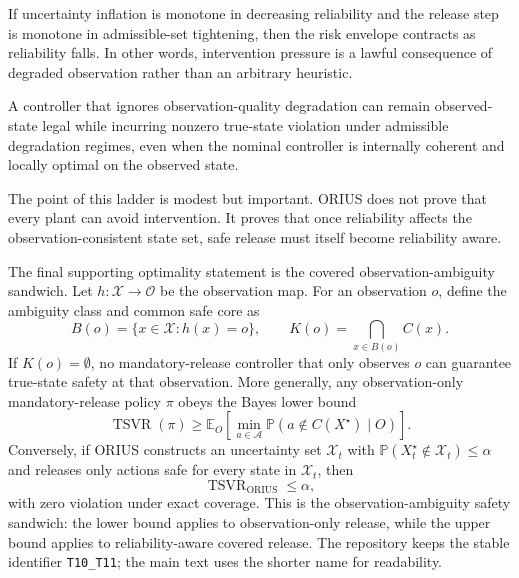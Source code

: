 \begin{theorem}
\label{thm:risk-envelope}
If uncertainty inflation is monotone in decreasing reliability and the release step is
monotone in admissible-set tightening, then the risk envelope contracts as reliability
falls. In other words, intervention pressure is a lawful consequence of degraded
observation rather than an arbitrary heuristic.
\end{theorem}

\begin{proposition}
\label{prop:no-free-safety}
A controller that ignores observation-quality degradation can remain observed-state legal
while incurring nonzero true-state violation under admissible degradation regimes, even when
the nominal controller is internally coherent and locally optimal on the observed state.
\end{proposition}

The point of this ladder is modest but important. ORIUS does not prove that every plant can
avoid intervention. It proves that once reliability affects the observation-consistent state
set, safe release must itself become reliability aware.

The final supporting optimality statement is the covered observation-ambiguity
sandwich.  Let $h:\mathcal{X}\to\mathcal{O}$ be the observation map.  For an
observation $o$, define the ambiguity class and common safe core as
\[
  B(o)=\{x\in\mathcal{X}:h(x)=o\},\qquad
  K(o)=\bigcap_{x\in B(o)} C(x).
\]
If $K(o)=\emptyset$, no mandatory-release controller that only observes $o$ can
guarantee true-state safety at that observation.  More generally, any
observation-only mandatory-release policy $\pi$ obeys the Bayes lower bound
\[
  \operatorname{TSVR}(\pi)\ge
  \mathbb{E}_{O}\!\left[
    \min_{a\in\mathcal{A}}
    \mathbb{P}\!\left(a\notin C(X^\star)\mid O\right)
  \right].
\]
Conversely, if ORIUS constructs an uncertainty set $\mathcal{X}_t$ with
$\mathbb{P}(X^\star_t\notin\mathcal{X}_t)\le\alpha$ and releases only actions
safe for every state in $\mathcal{X}_t$, then
\[
  \operatorname{TSVR}_{\mathrm{ORIUS}}\le \alpha,
\]
with zero violation under exact coverage. This is the observation-ambiguity
safety sandwich: the lower bound applies to observation-only release, while the
upper bound applies to reliability-aware covered release. The repository keeps
the stable identifier \texttt{T10\_T11}; the main text uses the shorter name for
readability.

